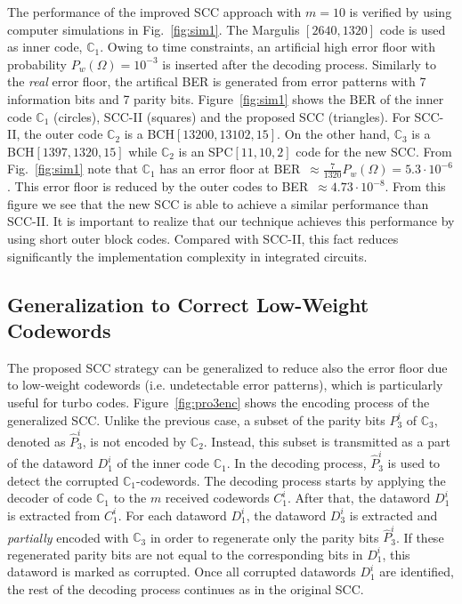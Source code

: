 \documentclass[conference]{IEEEtran}
\newcommand{\C}{\mathbb{C}}  %
\begin{document}
The performance of the improved SCC approach with $m=10$ is verified
by using computer simulations in Fig.~\ref{fig:sim1}. The Margulis
$[2640,1320]$ code is used as inner code, $\C_1$. Owing to time
constraints, an artificial high error floor with probability
$P_w(\Omega)=10^{-3}$ is inserted after the decoding
process. Similarly to the \emph{real} error floor, the artifical BER
is generated from error patterns with 7 information bits and 7 parity
bits. Figure~\ref{fig:sim1} shows the BER of the inner code $\C_1$
(circles), SCC-II (squares) and the proposed SCC (triangles). For
SCC-II, the outer code $\C_2$ is a BCH$[13200,13102,15]$. On the other
hand, $\C_3$ is a BCH$[1397,1320,15]$ while $\C_2$ is an
SPC$[11,10,2]$ code for the new SCC. From Fig.~\ref{fig:sim1} note
that $\C_1$ has an error floor at
BER~$\approx\frac{7}{1320}P_w(\Omega) = 5.3\cdot 10^{-6}$. This error
floor is reduced by the outer codes to BER~$\approx 4.73\cdot
10^{-8}$. From this figure we see that the new SCC is able to achieve
a similar performance than SCC-II. It is important to realize that our
technique achieves this performance by using short outer block
codes. Compared with SCC-II, this fact reduces significantly the
implementation complexity in integrated circuits.
 
\subsection{Generalization to Correct Low-Weight Codewords} \label{sec:proposed_scheme2}

The proposed SCC strategy can be generalized to reduce also the error
floor due to low-weight codewords (i.e. undetectable error patterns),
which is particularly useful for turbo codes. Figure~\ref{fig:pro3enc}
shows the encoding process of the generalized SCC. Unlike the previous
case, a subset of the parity bits $P^i_3$ of $\C_3$, denoted as
$\hat{P}^i_3$, is not encoded by $\C_2$. Instead, this subset is
transmitted as a part of the dataword $D^i_1$ of the inner code
$\C_1$. In the decoding process, $\hat{P}^i_3$ is used to detect the
corrupted $\C_1$-codewords. The decoding process starts by applying
the decoder of code $\C_1$ to the $m$ received codewords
$C_1^i$. After that, the dataword $D_1^i$ is extracted from
$C_1^i$. For each dataword $D^i_1$, the dataword $D^i_3$ is extracted
and \textit{partially} encoded with $\C_3$ in order to regenerate only
the parity bits $\hat{P}^i_3$. If these regenerated parity bits are
not equal to the corresponding bits in $D^i_1$, this dataword is
marked as corrupted. Once all corrupted datawords $D^i_1$ are
identified, the rest of the decoding process continues as in the
original SCC.
\end{document}
